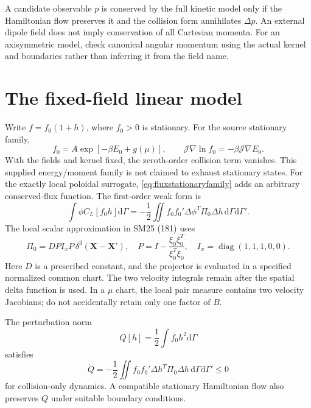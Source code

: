 \documentclass[11pt,letterpaper]{article}
\newcommand{\J}{\mathcal J}
\newcommand{\dd}{\mathrm d}
\newcommand{\X}{\mathbf X}
\newcommand{\diag}{\operatorname{diag}}
\begin{document}
A candidate observable $p$ is conserved by the full kinetic model only if the
Hamiltonian flow preserves it and the collision form annihilates $\Delta p$.
An external dipole field does not imply conservation of all Cartesian momenta.
For an axisymmetric model, check canonical angular momentum using the actual
kernel and boundaries rather than inferring it from the field name.

\section{The fixed-field linear model}

Write $f=f_0(1+h)$, where $f_0>0$ is stationary. For the source stationary family,
\begin{equation}
 f_0=A\exp[-\beta E_0+g(\mu)],
 \qquad \J\nabla\ln f_0=-\beta\J\nabla E_0.
 \label{eq:fzero}
\end{equation}
With the fields and kernel fixed, the zeroth-order collision term vanishes.
This supplied energy/moment family is not claimed to exhaust stationary
states. For the exactly local poloidal surrogate,
\eqref{eq:fluxstationaryfamily} adds an arbitrary conserved-flux function.
The first-order weak form is
\begin{equation}
 \int\phi C_L[f_0h]\dd\Gamma
 =-\frac12\iint f_0f_0'\Delta\phi^T\Pi_0\Delta h\,
 \dd\Gamma\dd\Gamma'.
 \label{eq:linearweak}
\end{equation}
The local scalar approximation in SM25 (181) uses
\begin{equation}
 \Pi_0=D P I_x P\,\delta^3(\X-\X'),\quad
 P=I-\frac{\xi_0\xi_0^T}{\xi_0^T\xi_0},\quad
 I_x=\diag(1,1,1,0,0).
 \label{eq:local}
\end{equation}
Here $D$ is a prescribed constant, and the projector is evaluated in a specified
normalized common chart. The two velocity integrals remain after the spatial
delta function is used. In a $\mu$ chart, the local pair measure contains two
velocity Jacobians; do not accidentally retain only one factor of $B$.

The perturbation norm
\begin{equation}
 Q[h]=\frac12\int f_0 h^2\dd\Gamma
 \label{eq:q}
\end{equation}
satisfies
\begin{equation}
 \dot Q=-\frac12\iint f_0f_0'\Delta h^T\Pi_0\Delta h\,
 \dd\Gamma\dd\Gamma'\le0
 \label{eq:qrate}
\end{equation}
for collision-only dynamics. A compatible stationary Hamiltonian flow also
preserves $Q$ under suitable boundary conditions.
\end{document}
